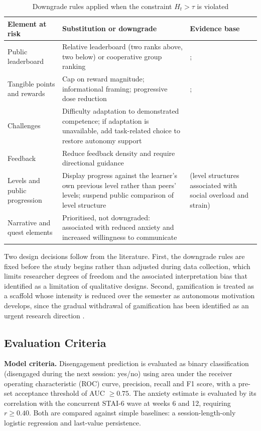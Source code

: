 \documentclass[12pt,a4paper]{article}
\begin{document}
\begin{justify}
\begin{table}[H]
\caption{Downgrade rules applied when the constraint $H_t > \tau$ is violated}
\label{tab:downgrade-rules}
\fontsize{10pt}{12pt}\selectfont
\begin{tabular}{|L{3.2cm}|L{6.4cm}|L{4.6cm}|}
\hline
\centering\textbf{Element at risk} & \centering\textbf{Substitution or downgrade} & \centering\textbf{Evidence base}
\tabularnewline
\hline
Public leaderboard & Relative leaderboard (two ranks above, two below) or cooperative group ranking & \textcite{nugroho2025negative}; \textcite{edwards2022anxiety}
\tabularnewline
\hline
Tangible points and rewards & Cap on reward magnitude; informational framing; progressive dose reduction & \textcite{gao2024sdt}; \textcite{nugroho2025negative}
\tabularnewline
\hline
Challenges & Difficulty adaptation to demonstrated competence; if adaptation is unavailable, add task-related choice to restore autonomy support & \textcite{gao2024sdt}
\tabularnewline
\hline
Feedback & Reduce feedback density and require directional guidance & \textcite{nugroho2025negative}
\tabularnewline
\hline
Levels and public progression & Display progress against the learner's own previous level rather than peers' levels; suspend public comparison of level structure & \textcite{nugroho2025negative} (level structures associated with social overload and strain)
\tabularnewline
\hline
Narrative and quest elements & Prioritised, not downgraded: associated with reduced anxiety and increased willingness to communicate & \textcite{edwards2022anxiety}
\tabularnewline
\hline
\end{tabular}
\end{table}

Two design decisions follow from the literature. First, the downgrade rules are fixed before the study begins rather than adjusted during data collection, which limits researcher degrees of freedom and the associated interpretation bias that \textcite{gul2026brainrot} identified as a limitation of qualitative designs. Second, gamification is treated as a scaffold whose intensity is reduced over the semester as autonomous motivation develops, since the gradual withdrawal of gamification has been identified as an urgent research direction \parencite{gao2024sdt}.


\subsection{Evaluation Criteria}

\textbf{Model criteria.} Disengagement prediction is evaluated as binary classification
(disengaged during the next session: yes/no) using area under the receiver operating characteristic (ROC) curve, precision, recall and
F1 score, with a pre-set acceptance threshold of AUC $\ge 0.75$. The anxiety estimate is evaluated by its
correlation with the concurrent STAI-6 wave at weeks 6 and 12, requiring $r \ge 0.40$. Both are
compared against simple baselines: a session-length-only logistic regression and last-value
persistence.


\end{justify}
\end{document}
